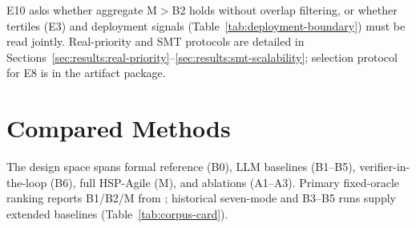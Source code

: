 \label{sec:exp:e11}\label{sec:exp:real-priority}\label{sec:exp:smt-scalability}%
E10 asks whether aggregate M${>}$B2 holds without overlap filtering, or
whether tertiles (E3) and deployment signals
(Table~\ref{tab:deployment-boundary}) must be read jointly.
Real-priority and SMT protocols are detailed in
Sections~\ref{sec:results:real-priority}--\ref{sec:results:smt-scalability};
selection protocol for E8 is in the artifact package.

\section{Compared Methods}
\label{sec:exp:methods}

The design space spans formal reference (B0), LLM baselines (B1--B5),
verifier-in-the-loop (B6), full HSP-Agile (M), and ablations (A1--A3).
Primary fixed-oracle ranking reports B1/B2/M from ;
historical seven-mode and B3--B5 runs supply extended baselines
(Table~\ref{tab:corpus-card}).

\begin{table}[H]
  \caption{Compared modes.
    Columns indicate whether each component is active.
    B3--B5 are evaluated in E1-ext (,
    repeat~0 merged into Table~\ref{tab:main-results}).}
  \label{tab:modes}
  \centering
\end{table}

